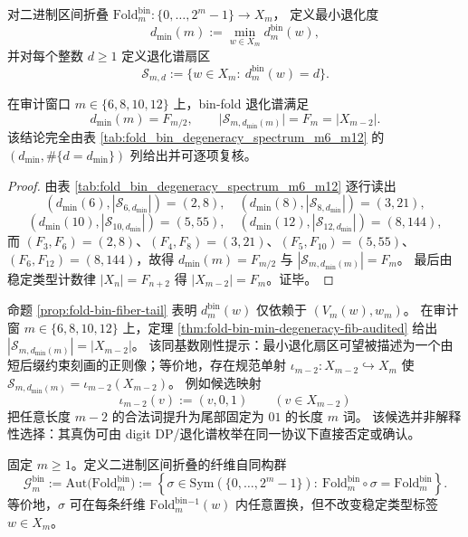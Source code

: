 \begin{definition}\label{def:fold-bin-degeneracy-sectors}
对二进制区间折叠 \(\mathrm{Fold}^{\mathrm{bin}}_m:\{0,\dots,2^m-1\}\to X_m\)，
定义最小退化度
\[
d_{\min}(m):=\min_{w\in X_m} d^{\mathrm{bin}}_m(w),
\]
并对每个整数 \(d\ge 1\) 定义退化谱扇区
\[
\mathcal{S}_{m,d}:=\{w\in X_m:\ d^{\mathrm{bin}}_m(w)=d\}.
\]
\end{definition}

\begin{theorem}\label{thm:fold-bin-min-degeneracy-fib-audited}
在审计窗口 \(m\in\{6,8,10,12\}\) 上，bin-fold 退化谱满足
\[
d_{\min}(m)=F_{m/2},
\qquad
\bigl|\mathcal{S}_{m,d_{\min}(m)}\bigr|=F_m=|X_{m-2}|.
\]
该结论完全由表 \ref{tab:fold_bin_degeneracy_spectrum_m6_m12} 的 \((d_{\min},\#\{d=d_{\min}\})\) 列给出并可逐项复核。
\end{theorem}
\begin{proof}
由表 \ref{tab:fold_bin_degeneracy_spectrum_m6_m12} 逐行读出
\[
(d_{\min}(6),|\mathcal{S}_{6,d_{\min}}|)=(2,8),\quad
(d_{\min}(8),|\mathcal{S}_{8,d_{\min}}|)=(3,21),
\]
\[
(d_{\min}(10),|\mathcal{S}_{10,d_{\min}}|)=(5,55),\quad
(d_{\min}(12),|\mathcal{S}_{12,d_{\min}}|)=(8,144),
\]
而 \((F_{3},F_{6})=(2,8)\)、\((F_{4},F_{8})=(3,21)\)、\((F_{5},F_{10})=(5,55)\)、\((F_{6},F_{12})=(8,144)\)，故得 \(d_{\min}(m)=F_{m/2}\) 与 \(|\mathcal{S}_{m,d_{\min}(m)}|=F_m\)。
最后由稳定类型计数律 \(|X_n|=F_{n+2}\) 得 \(|X_{m-2}|=F_m\)。证毕。
\end{proof}

\begin{remark}\label{rem:fold-bin-min-sector-cover-candidate}
命题 \ref{prop:fold-bin-fiber-tail} 表明 \(d^{\mathrm{bin}}_m(w)\) 仅依赖于 \((V_m(w),w_m)\)。
在审计窗 \(m\in\{6,8,10,12\}\) 上，定理 \ref{thm:fold-bin-min-degeneracy-fib-audited} 给出
\(
|\mathcal{S}_{m,d_{\min}(m)}|=|X_{m-2}|
\)。
该同基数刚性提示：最小退化扇区可望被描述为一个由短后缀约束刻画的正则像；等价地，存在规范单射
\(\iota_{m-2}:X_{m-2}\hookrightarrow X_m\) 使
\(
\mathcal{S}_{m,d_{\min}(m)}=\iota_{m-2}(X_{m-2})
\)。
例如候选映射
\[
\iota_{m-2}(v):=(v,0,1)\qquad (v\in X_{m-2})
\]
把任意长度 \(m-2\) 的合法词提升为尾部固定为 \(01\) 的长度 \(m\) 词。
该候选并非解释性选择：其真伪可由 digit DP/退化谱枚举在同一协议下直接否定或确认。
\end{remark}

\begin{definition}\label{def:fold-bin-gauge-group}
固定 \(m\ge 1\)。定义二进制区间折叠的纤维自同构群
\[
\mathcal{G}^{\mathrm{bin}}_m
:=
\mathrm{Aut}\!\bigl(\mathrm{Fold}^{\mathrm{bin}}_m\bigr)
:=
\left\{\sigma\in \mathrm{Sym}(\{0,\dots,2^m-1\}):\ \mathrm{Fold}^{\mathrm{bin}}_m\circ\sigma=\mathrm{Fold}^{\mathrm{bin}}_m\right\}.
\]
等价地，\(\sigma\) 可在每条纤维 \(\mathrm{Fold}^{\mathrm{bin}}_m{}^{-1}(w)\) 内任意置换，但不改变稳定类型标签 \(w\in X_m\)。
\end{definition}

